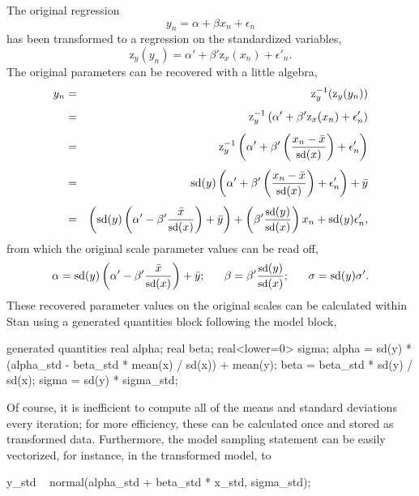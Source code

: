 The original regression
\[
y_n 
= \alpha + \beta x_n + \epsilon_n
\]
has been transformed to a regression on the standardized variables,
\[
\mbox{z}_y(y_n)
= \alpha'
+ \beta' \mbox{z}_x(x_n)
+ \epsilon'_n.
\]
The original parameters can be recovered with a little algebra,
%
\begin{eqnarray*}
y_n 
& = & \mbox{z}_y^{-1}(\mbox{z}_y(y_n))
\\[4pt]
& = & 
\mbox{z}_y^{-1} 
\left( 
\alpha' 
+ \beta' \mbox{z}_x(x_n)
+ \epsilon_n'
\right)
\\[4pt]
& = & 
\mbox{z}_y^{-1} 
\left( 
\alpha' 
+ \beta' 
    \left(  
      \frac{x_n - \bar{x}}{\mbox{\small sd}(x)}
    \right)
+ \epsilon_n'
\right)
\\[4pt]
& = & 
\mbox{sd}(y)
\left( 
\alpha' 
+ \beta' 
    \left(  
      \frac{x_n - \bar{x}}{\mbox{\small sd}(x)}
    \right)
+ \epsilon_n'
\right)
+ \bar{y}
\\[4pt]
& = & 
\left( 
  \mbox{sd}(y) 
      \left( 
          \alpha' 
          - \beta' \frac{\bar{x}}{\mbox{\small sd}(x)}
      \right) 
  + \bar{y}  
\right)
+ \left(
      \beta' \frac{\mbox{\small sd}(y)}{\mbox{\small sd}(x)} 
  \right) x_n
+ \mbox{sd}(y) \epsilon'_n,
\end{eqnarray*}
%
from which the original scale parameter values can be read off,
\[
\alpha 
=
\mbox{sd}(y) 
      \left( 
          \alpha' 
          - \beta' \frac{\bar{x}}{\mbox{\small sd}(x)}
      \right) 
  + \bar{y};
\ \ \ \ \ 
\beta = \beta' \frac{\mbox{\small sd}(y)}{\mbox{\small sd}(x)};
\ \ \ \ \
\sigma = \mbox{sd}(y) \sigma'.
\]
%
These recovered parameter values on the original scales can be
calculated within Stan using a generated quantities block following
the model block,
\begin{stancode}
generated quantities {
  real alpha;
  real beta;
  real<lower=0> sigma;
  alpha = sd(y) * (alpha_std - beta_std * mean(x) / sd(x)) 
           + mean(y);
  beta = beta_std * sd(y) / sd(x);
  sigma = sd(y) * sigma_std;
}
\end{stancode}
%
Of course, it is inefficient to compute all of the means and standard
deviations every iteration; for more efficiency, these can be
calculated once and stored as transformed data.  Furthermore, the
model sampling statement can be easily vectorized, for instance, in
the transformed model, to
\begin{stancode}
    y_std ~ normal(alpha_std + beta_std * x_std, sigma_std);
\end{stancode}



